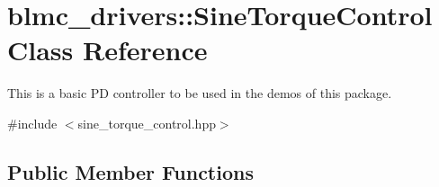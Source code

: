 \hypertarget{classblmc__drivers_1_1SineTorqueControl}{}\section{blmc\+\_\+drivers\+:\+:Sine\+Torque\+Control Class Reference}
\label{classblmc__drivers_1_1SineTorqueControl}


This is a basic PD controller to be used in the demos of this package.  




{\ttfamily \#include $<$sine\+\_\+torque\+\_\+control.\+hpp$>$}

\subsection*{Public Member Functions}
